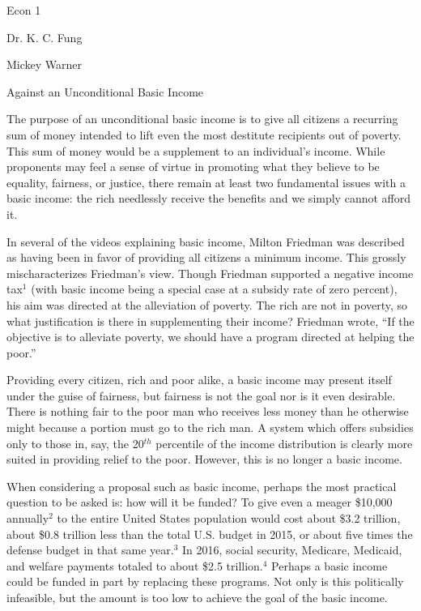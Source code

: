 \documentclass[12pt]{article}
\begin{document}
\noindent Econ 1

\noindent Dr. K. C. Fung
\bigskip

\noindent Mickey Warner

\begin{center}
Against an Unconditional Basic Income
\end{center}

The purpose of an unconditional basic income is to give all citizens a recurring sum of money intended to lift even the most destitute recipients out of poverty. This sum of money would be a supplement to an individual's income. While proponents may feel a sense of virtue in promoting what they believe to be equality, fairness, or justice, there remain at least two fundamental issues with a basic income: the rich needlessly receive the benefits and we simply cannot afford it.

In several of the videos explaining basic income, Milton Friedman was described as having been in favor of providing all citizens a minimum income. This grossly mischaracterizes Friedman's view. Though Friedman supported a negative income tax$^1$ (with basic income being a special case at a subsidy rate of zero percent), his aim was directed at the alleviation of poverty. The rich are not in poverty, so what justification is there in supplementing their income? Friedman wrote, ``If the objective is to alleviate poverty, we should have a program directed at helping the poor.''

Providing every citizen, rich and poor alike, a basic income may present itself under the guise of fairness, but fairness is not the goal nor is it even desirable. There is nothing fair to the poor man who receives less money than he otherwise might because a portion must go to the rich man. A system which offers subsidies only to those in, say, the 20$^{th}$ percentile of the income distribution is clearly more suited in providing relief to the poor. However, this is no longer a basic income.

When considering a proposal such as basic income, perhaps the most practical question to be asked is: how will it be funded? To give even a meager \$10,000 annually$^2$ to the entire United States population would cost about \$3.2 trillion, about \$0.8 trillion less than the total U.S. budget in 2015, or about five times the defense budget in that same year.$^3$ In 2016, social security, Medicare, Medicaid, and welfare payments totaled to about \$2.5 trillion.$^4$ Perhaps a basic income could be funded in part by replacing these programs. Not only is this politically infeasible, but the amount is too low to achieve the goal of the basic income.
\end{document}

